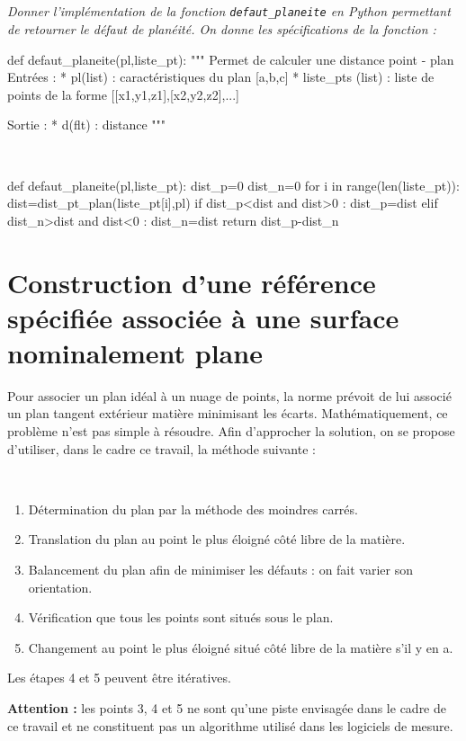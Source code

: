\subparagraph{}
\textit{Donner l'implémentation de la fonction \texttt{defaut\_planeite} en Python permettant de retourner le défaut de planéité. On donne les spécifications de la fonction : }
\begin{py}
\begin{python} 
def defaut_planeite(pl,liste_pt):
    """
    Permet de calculer une distance point - plan
    Entrées : 
        * pl(list) : caractéristiques du plan [a,b,c]
        * liste_pts (list) : liste de points de la forme [[x1,y1,z1],[x2,y2,z2],...]
        
    Sortie : 
        * d(flt) : distance
    """
\end{python}
\end{py}
\ifprof
\begin{corrige}~\\
\begin{python}
def defaut_planeite(pl,liste_pt):
    dist_p=0
    dist_n=0
    for i in range(len(liste_pt)):
        dist=dist_pt_plan(liste_pt[i],pl)
        if dist_p<dist and dist>0 :
            dist_p=dist
        elif dist_n>dist and dist<0 :
            dist_n=dist
    return dist_p-dist_n
\end{python}
\end{corrige}
\else
\fi

\section{Construction d'une référence spécifiée associée à une surface nominalement plane}

\ifprof
\else

Pour associer un plan idéal à un nuage de points, la norme prévoit de lui associé un plan tangent extérieur matière minimisant les écarts. Mathématiquement, ce problème n'est pas simple à résoudre. Afin d'approcher la solution, on se propose d'utiliser, dans le cadre ce travail,  la méthode suivante : 

\begin{methode}
~\\
\begin{enumerate}
\item Détermination du plan par la méthode des moindres carrés.
\item Translation du plan au point le plus éloigné côté libre de la matière.
\item Balancement du plan afin de minimiser les défauts : on fait varier son orientation.
\item Vérification que tous les points sont situés sous le plan.
\item Changement au point le plus éloigné situé côté libre de la matière s'il y en a.
\end{enumerate}
Les étapes 4 et 5 peuvent être itératives.
\begin{warn}
\textbf{\textsf{Attention :}} les points 3, 4 et 5 ne sont qu'une piste envisagée dans le cadre de ce travail et ne constituent pas un algorithme utilisé dans les logiciels de mesure.
\end{warn}
\end{methode}

